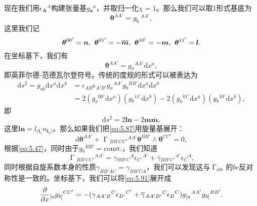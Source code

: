 现在我们用$\epsilon {_{\boldsymbol{A}}}^{A}$构建张量基$g{_{\boldsymbol{a}}}^{a}$，并取归一化$\chi =1$。那么我们可以取1形式基底为
\begin{equation*}
	\boldsymbol{\theta}^{AA'} =g{_{\boldsymbol{i}_{1}}}^{AA'} ,
\end{equation*}
这里我们记
\begin{equation*}
	\boldsymbol{\theta}^{00'} =\boldsymbol{n} ,\kern+0.4em \boldsymbol{\theta}^{01'} =-\overline{\boldsymbol{m}} ,\boldsymbol{\kern+0.4em }\boldsymbol{\theta}^{10'} =-\boldsymbol{m} ,\kern+0.4em \boldsymbol{\theta}^{11'} =\boldsymbol{l} .
\end{equation*}
在坐标基下，我们有
\begin{equation*}
	\boldsymbol{\theta}^{AA'} =g{_{a}}^{AA'}\mathrm{d} x^{a} ,
\end{equation*}
即英菲尔德-范德瓦尔登符号。传统的度规的形式可以被表达为
\begin{equation}
	\begin{aligned}
		\mathrm{d} s^{2} =g_{ab}\mathrm{d} x^{a}\mathrm{d} x^{b} & =\epsilon _{AB} \epsilon _{A'B'} g{_{a}}^{AA'} g{_{b}}^{BB'}\mathrm{d} x^{a}\mathrm{d} x^{b}\\
		& =2(g{_{a}}^{00'}\mathrm{d} x^{a} )(g{_{b}}^{11'}\mathrm{d} x^{b} )-2(g{_{a}}^{01'}\mathrm{d} x^{a} )(g{_{b}}^{10'}\mathrm{d} x^{b} ),
	\end{aligned}
	\label{eq:5.89}
\end{equation}
即
\begin{equation}
	\mathrm{d} s^{2} =2\boldsymbol{ln} -2\boldsymbol{m}\overline{\boldsymbol{m}} ,
	\label{eq:5.90}
\end{equation}
这里$\boldsymbol{ln} =l_{(\boldsymbol{i}_{1}} n_{\boldsymbol{i}_{2})}$。那么如果我们把\ref{eq:5.87}用旋量基展开：
\begin{equation}
	\mathrm{d}\boldsymbol{\theta}^{AA'} +\upGamma {_{BB'CC'}}^{AA'}\boldsymbol{\theta}^{BB'} \land \boldsymbol{\theta}^{CC'} =0,
	\label{eq:5.91}
\end{equation}
根据\ref{eq:5.47}，同时由于$g{_{b}}^{BB'} =\mathrm{const.}$，我们知道
\begin{equation*}
	\upGamma {_{BB'CC'}}^{AA'} =\gamma {_{BB'C}}^{A} \epsilon {_{C'}}^{A'} +\overline{\gamma }{_{BB'C'}}^{A'} \epsilon {_{C}}^{A} ,
\end{equation*}
同时根据自旋系数本身的性质$\gamma _{BB'AC} =\gamma _{BB'CA}$，我们可以发现这与$\upGamma _{abc}$的$bc$反对称性是一致的。坐标基下，我们可以将\ref{eq:5.91}展开成
\begin{equation*}
	\frac{\partial }{\partial x} \kern+0.01em _{[ a} g{_{b]}}^{CC'} =-(\gamma {_{AA'B}}^{C} \epsilon {_{B'}}^{C'} +\overline{\gamma }{_{AA'B'}}^{C} \epsilon {_{B}}^{C} )g{_{[ a}}^{AA'} g{_{b]}}^{BB'} .
\end{equation*}
